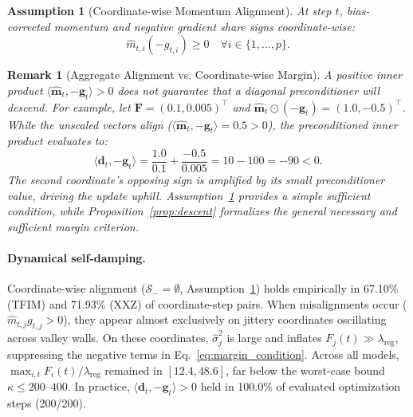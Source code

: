 \documentclass[sn-mathphys,Numbered]{sn-jnl}
\theoremstyle{thmstyleone}
\theoremstyle{thmstyletwo}
\newtheorem{remark}{Remark}
\theoremstyle{thmstylethree}
\newtheorem{assumption}{Assumption}
\begin{document}
\begin{assumption}[Coordinate-wise Momentum Alignment]
\label{ass:alignment}
At step $t$, bias-corrected momentum and negative gradient share signs coordinate-wise:
\begin{equation}
\hat{m}_{t,i} (-g_{t,i}) \ge 0 \quad \forall i \in \{1, \dots, p\}.
\end{equation}
\end{assumption}

\begin{remark}[Aggregate Alignment vs. Coordinate-wise Margin]
\label{rem:alignment_margin}
A positive inner product $\langle \hat{\mathbf{m}}_t, -\mathbf{g}_t \rangle > 0$ does not guarantee that a diagonal preconditioner will descend. For example, let $\mathbf{F} = (0.1, 0.005)^\top$ and $\hat{\mathbf{m}}_t \odot (-\mathbf{g}_t) = (1.0, -0.5)^\top$. While the unscaled vectors align ($\langle \hat{\mathbf{m}}_t, -\mathbf{g}_t \rangle = 0.5 > 0$), the preconditioned inner product evaluates to:
\[
\langle \mathbf{d}_t, -\mathbf{g}_t \rangle = \frac{1.0}{0.1} + \frac{-0.5}{0.005} = 10 - 100 = -90 < 0.
\]
The second coordinate's opposing sign is amplified by its small preconditioner value, driving the update uphill. Assumption~\ref{ass:alignment} provides a simple sufficient condition, while Proposition~\ref{prop:descent} formalizes the general necessary and sufficient margin criterion.
\end{remark}

\paragraph{Dynamical self-damping.}
Coordinate-wise alignment ($\mathcal{S}_- = \emptyset$, Assumption~\ref{ass:alignment}) holds empirically in 67.10\% (TFIM) and 71.93\% (XXZ) of coordinate-step pairs. When misalignments occur ($\hat{m}_{t,j} g_{t,j} > 0$), they appear almost exclusively on jittery coordinates oscillating across valley walls. On these coordinates, $\hat{\sigma}_j^2$ is large and inflates $F_j(t) \gg \lambda_{\text{reg}}$, suppressing the negative terms in Eq.~\eqref{eq:margin_condition}. Across all models, $\max_{i,t} F_i(t)/\lambda_{\text{reg}}$ remained in $[12.4, 48.6]$, far below the worst-case bound $\kappa \le 200$--$400$. In practice, $\langle \mathbf{d}_t, -\mathbf{g}_t \rangle > 0$ held in 100.0\% of evaluated optimization steps (200/200).
\end{document}
